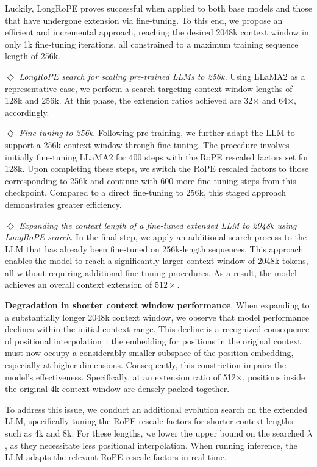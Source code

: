 Luckily, LongRoPE proves successful when applied to both base models and those that have undergone extension via fine-tuning. To this end, we propose an efficient and incremental approach, reaching the desired 2048k context window in only 1k fine-tuning iterations, all constrained to a maximum training sequence length of 256k.

$\Diamond$ \textit{LongRoPE search for scaling pre-trained LLMs to 256k.} Using LLaMA2 as a representative case, we perform a search targeting context window lengths of 128k and 256k. At this phase, the extension ratios achieved are 32$\times$ and 64$\times$, accordingly.

$\Diamond$ \textit{Fine-tuning to 256k}. Following pre-training, we further adapt the LLM to support a 256k context window through fine-tuning. The procedure involves initially fine-tuning LLaMA2 for 400 steps with the RoPE rescaled factors set for 128k. Upon completing these steps, we switch the RoPE rescaled factors to those corresponding to 256k and continue with 600 more fine-tuning steps from this checkpoint. Compared to a direct fine-tuning to 256k, this staged approach demonstrates greater efficiency.

$\Diamond$ \textit{Expanding the context length of a fine-tuned extended LLM to 2048k using LongRoPE search}. In the final step, we apply an additional search process to the LLM that has already been fine-tuned on 256k-length sequences. This approach enables the model to reach a significantly larger context window of 2048k tokens, all without requiring additional fine-tuning procedures. As a result, the model achieves an overall context extension of $512\times$.

\textbf{Degradation in shorter context window performance}. When expanding to a substantially longer 2048k context window, we observe that model performance declines within the initial context range. This decline is a recognized consequence of positional interpolation~\cite{pi}: the embedding for positions in the original context must now occupy a considerably smaller subspace of the position embedding, especially at higher dimensions. Consequently, this constriction impairs the model’s effectiveness. Specifically, at an extension ratio of 512$\times$, positions inside the original 4k context window are densely packed together.

To address this issue, we conduct an additional evolution search on the extended LLM, specifically tuning the RoPE rescale factors for shorter context lengths such as 4k and 8k. For these lengths, we lower the upper bound on the searched $\lambda$, as they necessitate less positional interpolation. When running inference, the LLM adapts the relevant RoPE rescale factors in real time.

